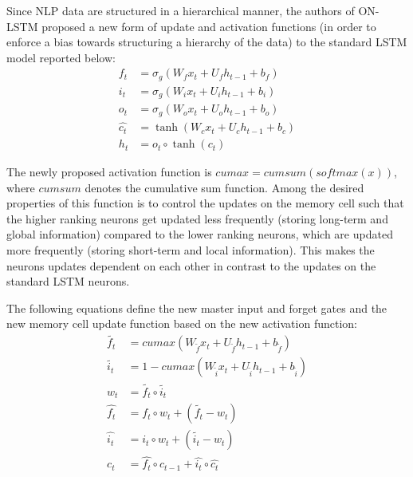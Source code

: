\documentclass[11pt,a4paper]{article}
\begin{document}
Since NLP data are structured in a hierarchical manner, the authors of ON-LSTM \cite{shen2018ordered} proposed a new form of update and activation functions (in order to enforce a bias towards structuring a hierarchy of the data) to the standard LSTM model reported below:
\begin{align}
f_t &= \sigma_g (W_f x_t + U_f h_{t-1} + b_f)\\
i_t &= \sigma_g (W_i x_t + U_i h_{t-1} + b_i)\\
o_t &= \sigma_g (W_o x_t + U_o h_{t-1} + b_o)\\
\hat{c_t} &= \tanh (W_c x_t + U_c h_{t-1} + b_c)\\
h_t &= o_t \circ \tanh (c_t)
\end{align}

The newly proposed activation function is $cumax = cumsum(softmax(x))$, where $cumsum$ denotes the cumulative sum function. Among the desired properties of this function is to control the updates on the memory cell such that the higher ranking neurons get updated less frequently (storing long-term and global information) compared to the lower ranking neurons, which are updated more frequently (storing short-term and local information). This makes the neurons updates dependent on each other in contrast to the updates on the standard LSTM neurons.

The following equations define the new master input and forget gates and the new memory cell update function based on the new activation function:
\begin{align}
\tilde{f_t} &= cumax(W_{\tilde{f}} x_t + U_{\tilde{f}} h_{t-1} + b_{\tilde{f}})\\
\tilde{i_t} &= 1 - cumax(W_{\tilde{i}} x_t + U_{\tilde{i}} h_{t-1} + b_{\tilde{i}})\\
w_t &= \tilde{f_t} \circ \tilde{i_t}\\
\hat{f_t} &= f_t \circ w_t + (\tilde{f_t} - w_t)\\
\hat{i_t} &= i_t \circ w_t + (\tilde{i_t} - w_t)\\
c_t &= \hat{f_t} \circ c_{t-1} + \hat{i_t} \circ \hat{c_t}
\end{align}
\end{document}
